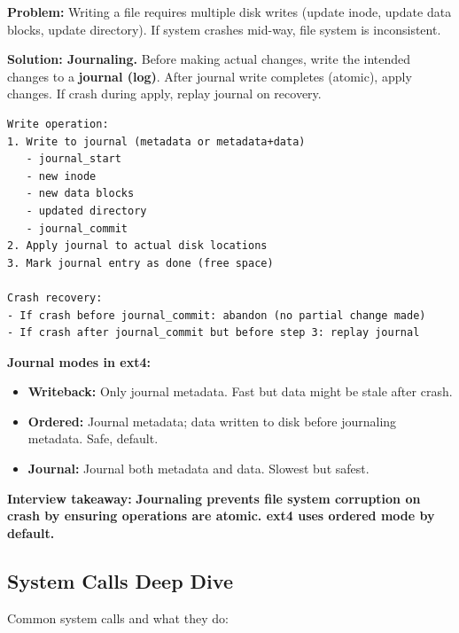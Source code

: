 \documentclass[11pt]{article}
\providecommand{\tightlist}{\setlength{\itemsep}{1pt}\setlength{\parskip}{0pt}}
\begin{document}
\textbf{Problem:} Writing a file requires multiple disk writes (update inode, update data blocks, update directory). If system crashes mid-way, file system is inconsistent.

\textbf{Solution: Journaling.} Before making actual changes, write the intended changes to a \textbf{journal (log)}. After journal write completes (atomic), apply changes. If crash during apply, replay journal on recovery.

\setcodelang{}

\begin{verbatim}
Write operation:
1. Write to journal (metadata or metadata+data)
   - journal_start
   - new inode
   - new data blocks
   - updated directory
   - journal_commit
2. Apply journal to actual disk locations
3. Mark journal entry as done (free space)

Crash recovery:
- If crash before journal_commit: abandon (no partial change made)
- If crash after journal_commit but before step 3: replay journal
\end{verbatim}

\textbf{Journal modes in ext4:}

\begin{itemize}
\tightlist
\item
  \textbf{Writeback:} Only journal metadata. Fast but data might be stale after crash.
\item
  \textbf{Ordered:} Journal metadata; data written to disk before journaling metadata. Safe, default.
\item
  \textbf{Journal:} Journal both metadata and data. Slowest but safest.
\end{itemize}

\textbf{Interview takeaway:} \textbf{Journaling prevents file system corruption on crash by ensuring operations are atomic. ext4 uses ordered mode by default.}

\subsection{System Calls Deep Dive}\label{system-calls-deep-dive}

Common system calls and what they do:
\end{document}
